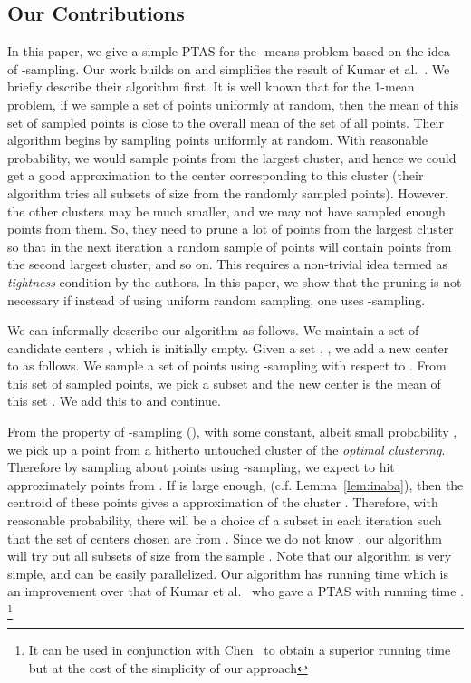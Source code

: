 \documentclass[a4paper]{article}
\begin{document}
\subsection{Our Contributions}
In this paper, we give a simple PTAS for the -means problem based on the idea of -sampling. Our work
builds on and simplifies the result of Kumar et al.~\cite{KumarSS10}. We briefly describe their algorithm first.
It is well known that for the 1-mean problem, if we sample a set of  points uniformly at random, then
the mean of this set of sampled points is close to the overall mean of the set of all points. Their algorithm
begins by sampling  points uniformly at random. With reasonable probability, we would sample 
points from the largest cluster, and hence we could get a good approximation to the center corresponding to this cluster
(their algorithm tries all subsets of size  from the randomly sampled points). However, the other clusters
may be much smaller, and we may not have sampled enough points from them. So, they need to prune a lot of points
from the largest cluster so that in the next iteration a random sample of  points will contain 
points from the second largest cluster, and so on. This requires a  non-trivial idea termed as {\em tightness}
 condition by the authors. In this paper,
we show that the pruning is not necessary if  instead of using uniform random sampling, one uses -sampling.

We can informally describe our algorithm as follows. We maintain a set of
candidate centers , which is initially empty.
Given a set , , we add a new center to  as follows. We sample a set  of  points using
-sampling with respect to . From this set of sampled points, we pick a
subset  and the new center is
the mean of this set . We add this to  and continue.

From the property of -sampling (\cite{AggarwalDK09,AJMonteleoni09}),
with some constant, albeit small probability , we pick up a point from
a hitherto untouched cluster  of the {\em optimal clustering}. Therefore
by sampling about  points using -sampling, we expect to hit
approximately  points from . If  is large enough,
(c.f. Lemma~\ref{lem:inaba}), then the centroid of these  points gives a
 approximation of the cluster .
Therefore, with reasonable probability, there will be
a choice of a subset  in each iteration such that the set of
centers chosen are from . Since we do not know , our algorithm will
try out all subsets of size  from the sample .
Note that our algorithm is very
simple, and can be easily parallelized.
Our algorithm has running time  which is an improvement over that of Kumar et al.~\cite{KumarSS10} who
gave a PTAS with running time .
\footnote{It can be used in conjunction with Chen~\cite{Chen06} to obtain
a superior running time but at the cost of the simplicity of our approach}
\end{document}
